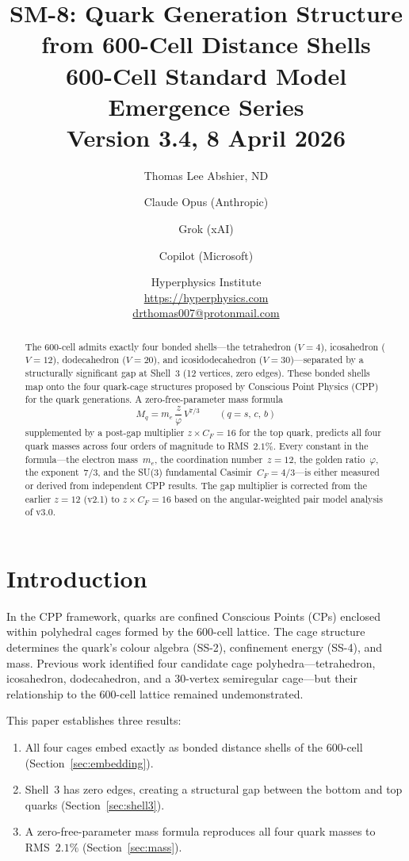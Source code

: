\documentclass[11pt,letterpaper]{article}
\title{\textbf{SM-8: Quark Generation Structure\\from 600-Cell Distance Shells}\\[6pt]
{\large 600-Cell Standard Model Emergence Series}\\[4pt]
{\normalsize Version 3.4, 8 April 2026}}
\author{Thomas Lee Abshier, ND \and Claude Opus (Anthropic)
\and Grok (xAI) \and Copilot (Microsoft)}
\date{\normalsize Hyperphysics Institute\\
\url{https://hyperphysics.com}\\
\href{mailto:drthomas007@protonmail.com}{drthomas007@protonmail.com}}
\newcommand{\phig}{\varphi}
\begin{document}
\maketitle

\begin{abstract}
The 600-cell admits exactly four bonded shells---the tetrahedron
($V\!=\!4$), icosahedron ($V\!=\!12$), dodecahedron ($V\!=\!20$),
and icosidodecahedron ($V\!=\!30$)---separated by a structurally
significant gap at Shell~3 (12 vertices, zero edges).  These bonded
shells map onto the four quark-cage structures proposed by Conscious
Point Physics (CPP) for the quark generations.  A zero-free-parameter
mass formula
\[
  M_q = m_e \,\frac{z}{\phig}\, V^{7/3}
  \qquad (q = s,\, c,\, b)
\]
supplemented by a post-gap multiplier $z \times C_F = 16$ for the
top quark, predicts all four quark masses across four orders of
magnitude to RMS~$2.1\%$.  Every constant in the formula---the
electron mass~$m_e$, the coordination number~$z\!=\!12$, the golden
ratio~$\phig$, the exponent~$7/3$, and the SU(3) fundamental
Casimir~$C_F\!=\!4/3$---is either measured or derived from
independent CPP results.  The gap multiplier is corrected from the
earlier $z\!=\!12$ (v2.1) to $z \times C_F\!=\!16$ based on the
angular-weighted pair model analysis of v3.0.
\end{abstract}

\tableofcontents

\section{Introduction}
\label{sec:intro}

In the CPP framework, quarks are confined Conscious Points (CPs)
enclosed within polyhedral cages formed by the 600-cell lattice.
The cage structure determines the quark's colour algebra (SS-2),
confinement energy (SS-4), and mass.  Previous work identified four
candidate cage polyhedra---tetrahedron, icosahedron, dodecahedron,
and a 30-vertex semiregular cage---but their relationship to the
600-cell lattice remained undemonstrated.

This paper establishes three results:
\begin{enumerate}
\item All four cages embed exactly as bonded distance shells of
  the 600-cell (Section~\ref{sec:embedding}).
\item Shell~3 has zero edges, creating a structural gap between
  the bottom and top quarks (Section~\ref{sec:shell3}).
\item A zero-free-parameter mass formula reproduces all four quark
  masses to RMS~$2.1\%$ (Section~\ref{sec:mass}).
\end{enumerate}
\end{document}
